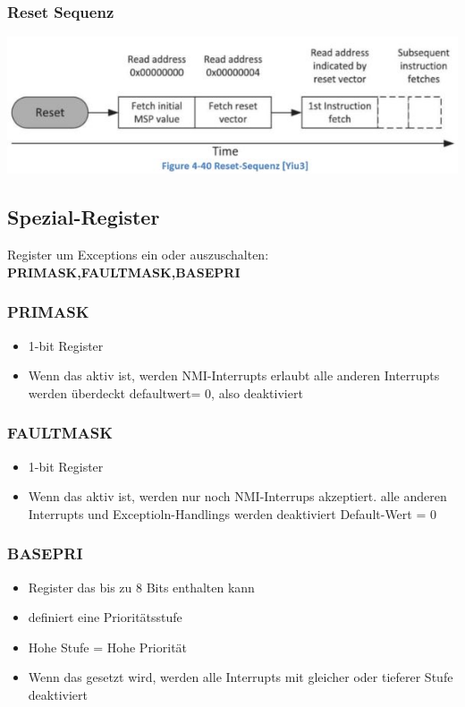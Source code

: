 \subsubsection{Reset Sequenz}
     \includegraphics{images/resetsequenz}
\subsection{Spezial-Register}     
Register um Exceptions ein oder auszuschalten:\\
\textbf{\rightarrow PRIMASK,FAULTMASK,BASEPRI}
\begin{multicols}{2}
    \subsubsection{PRIMASK}
    \begin{itemize}
        \item 1-bit Register
        \item Wenn das aktiv ist, werden NMI-Interrupts erlaubt
        \subitem \rightarrow alle anderen Interrupts werden überdeckt
        \subitem \rightarrow defaultwert= 0, also deaktiviert
    \end{itemize}
    
    \subsubsection{FAULTMASK}
    \begin{itemize}
        \item 1-bit Register
        \item Wenn das aktiv ist, werden nur noch NMI-Interrups akzeptiert.\newline
        alle anderen Interrupts und Exceptioln-Handlings werden deaktiviert
        \subitem \rightarrow Default-Wert = 0
    \end{itemize}
\end{multicols}

\subsubsection{BASEPRI}
\begin{itemize}
    \item Register das bis zu 8 Bits enthalten kann
    \item definiert eine Prioritätsstufe
    \item Hohe Stufe = Hohe Priorität
    \item Wenn das gesetzt wird, werden alle Interrupts mit gleicher oder tieferer Stufe deaktiviert
\end{itemize}

